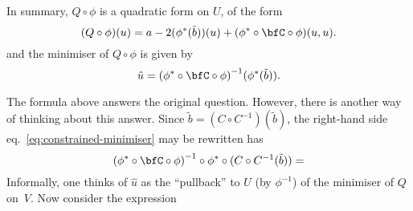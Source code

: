 \documentclass[10pt, a4paper]{article}
\begin{document}
In summary, $Q\circ\phi$ is a quadratic form on $U$, of the form
\[
(Q\circ\phi)(u) = a - 2(\phi^*(\tilde{b}))(u) + (\phi^*\circ\bfC\circ\phi)(u, u).
\]
and the minimiser of $Q\circ\phi$ is given by
\begin{equation}
\hat{u} = {(\phi^*\circ\bfC\circ\phi)}^{-1}(\phi^*(\tilde{b})).
\label{eq:constrained-minimiser}
\end{equation}

The formula above answers the original question. However, there is
another way of thinking about this answer. Since
$\tilde{b}=(C\circ C^{-1})(\tilde{b})$, the right-hand side
eq.~\eqref{eq:constrained-minimiser} may be rewritten has
\[
  {(\phi^*\circ\bfC\circ\phi)}^{-1}\circ\phi^*\circ(C\circ C^{-1}(\tilde{b})) = 
\]
Informally, one thinks of $\hat{u}$ as the ``pullback'' to $U$ (by
$\phi^{-1}$) of the minimiser of $Q$ on~$V$. Now consider the expression 
\end{document}
